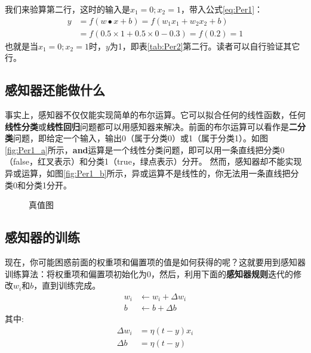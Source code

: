 我们来验算第二行，这时的输入是$x_1=0;x_2=1$，带入公式\ref{eq:Per1}：
\begin{align*}
	y & =f(w \bullet x + b) = f(w_1x_1+w_2x_2+b)   \\
	  & =f(0.5\times1+0.5\times0-0.3) = f(0.2) = 1
\end{align*}
也就是当$x_1=0;x_2=1$时，$y$为1，即表\ref{tab:Per2}第二行。读者可以自行验证其它行。


\subsection{感知器还能做什么}\label{Per:4}

事实上，感知器不仅仅能实现简单的布尔运算。它可以拟合任何的线性函数，任何\textbf{线性分类}或\textbf{线性回归}问题都可以用感知器来解决。前面的布尔运算可以看作是\textbf{二分类}问题，即给定一个输入，输出0（属于分类0）或1（属于分类1）。如图\ref{fig:Per1_a}所示，\textcolor{main}{\textbf{and}}运算是一个线性分类问题，即可以用一条直线把分类0（false，红叉表示）和分类1（true，绿点表示）分开。
然而，感知器却不能实现异或运算，如图\ref{fig:Per1_b}所示，异或运算不是线性的，你无法用一条直线把分类0和分类1分开。

\begin{figure}[htbp]
	\centering
	\centering
	\caption{真值图}
	\label{fig:Per1}
\end{figure}


\subsection{感知器的训练}\label{Per:4}

现在，你可能困惑前面的权重项和偏置项的值是如何获得的呢？这就要用到感知器训练算法：将权重项和偏置项初始化为0，然后，利用下面的\textbf{感知器规则}迭代的修改$w_i$和$b$，直到训练完成。
\begin{align*}
	w_i & \gets w_i+\Delta w_i \\
	b   & \gets b+\Delta b
\end{align*}
其中:
\begin{align*}
	\Delta w_i & =\eta(t-y)x_i \\
	\Delta b   & =\eta(t-y)
\end{align*}

